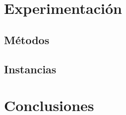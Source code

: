 \documentclass[10pt,a4paper]{article}
\begin{document}
\section{Experimentación} \label{sec:experimentacion}

\subsection{Métodos}

\subsection{Instancias}


\section{Conclusiones} \label{sec:conclusiones}

\newpage

\end{document}
